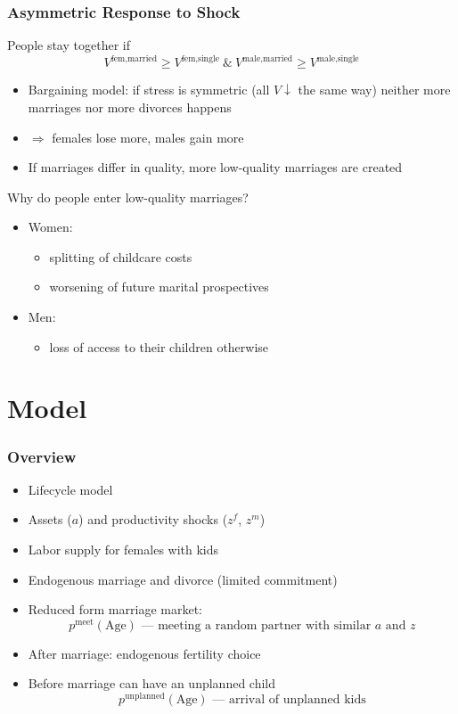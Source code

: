 \documentclass{beamer}
\begin{document}
\begin{frame}
\frametitle{Asymmetric Response to Shock}
People stay together if
\[V^{\text{fem},\text{married}} \geq V^{\text{fem},\text{single}} \ \& \ V^{\text{male},\text{married}} \geq V^{\text{male},\text{single}}\]
\vspace{-1em}
\begin{itemize}
\item Bargaining model: if stress is symmetric (all $V\downarrow$ the same way) neither more marriages nor more divorces happens
\item $\Rightarrow$ females lose more, males gain more
\item If marriages differ in quality, more low-quality marriages are created
\end{itemize}

Why do people enter low-quality marriages?
\begin{itemize}
\item Women:
\begin{itemize}
\item splitting of childcare costs
\item worsening of future marital prospectives
\end{itemize}
\item Men:
\begin{itemize}
\item loss of access to their children otherwise
\end{itemize}
\end{itemize}
\end{frame}



\section{Model}

\begin{frame}
\frametitle{Overview}
\begin{itemize}
\item Lifecycle model
\item Assets ($a$) and productivity shocks ($z^f$, $z^m$)
\item Labor supply for females with kids
\item Endogenous marriage and divorce (limited commitment)
\item Reduced form marriage market:
\[p^{\text{meet}}(\text{Age}) \text{ --- meeting a random partner with similar $a$ and $z$}\]
\item After marriage: endogenous fertility choice
\item Before marriage can have an unplanned child
\[p^{\text{unplanned}}(\text{Age}) \text{ --- arrival of unplanned kids}\]
\end{itemize}
\end{frame}
\end{document}

